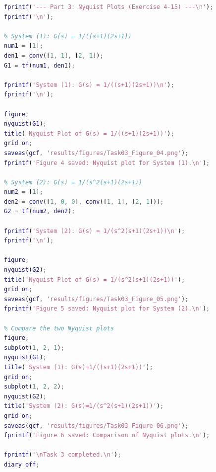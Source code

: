 \documentclass{../common/SCNU_Experimental_Report}
\begin{document}
\begin{lstlisting}[language=Matlab]
%% Part 3: Exercise 4-15 - Nyquist Plots for Two Systems
fprintf('--- Part 3: Nyquist Plots (Exercise 4-15) ---\n');
fprintf('\n');

% System (1): G(s) = 1/((s+1)(2s+1))
num1 = [1];
den1 = conv([1, 1], [2, 1]);
G1 = tf(num1, den1);

fprintf('System (1): G(s) = 1/((s+1)(2s+1))\n');
fprintf('\n');

figure;
nyquist(G1);
title('Nyquist Plot of G(s) = 1/((s+1)(2s+1))');
grid on;
saveas(gcf, 'results/figures/Task03_Figure_04.png');
fprintf('Figure 4 saved: Nyquist plot for System (1).\n');

% System (2): G(s) = 1/(s^2(s+1)(2s+1))
num2 = [1];
den2 = conv([1, 0, 0], conv([1, 1], [2, 1]));
G2 = tf(num2, den2);

fprintf('System (2): G(s) = 1/(s^2(s+1)(2s+1))\n');
fprintf('\n');

figure;
nyquist(G2);
title('Nyquist Plot of G(s) = 1/(s^2(s+1)(2s+1))');
grid on;
saveas(gcf, 'results/figures/Task03_Figure_05.png');
fprintf('Figure 5 saved: Nyquist plot for System (2).\n');

% Compare the two Nyquist plots
figure;
subplot(1, 2, 1);
nyquist(G1);
title('System (1): G(s)=1/((s+1)(2s+1))');
grid on;
subplot(1, 2, 2);
nyquist(G2);
title('System (2): G(s)=1/(s^2(s+1)(2s+1))');
grid on;
saveas(gcf, 'results/figures/Task03_Figure_06.png');
fprintf('Figure 6 saved: Comparison of Nyquist plots.\n');

fprintf('\nTask 3 completed.\n');
diary off;
\end{lstlisting}
\end{document}

